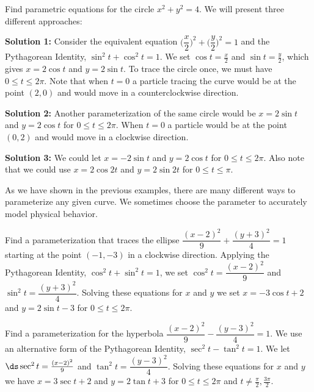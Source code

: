 \begin{example}\label{ex_par_circle}
Find parametric equations for the circle $x^2+y^2=4$.
\solution
We will present three different approaches:

\textbf{Solution 1:} Consider the equivalent equation $\biggl(\dfrac{x}{2}\biggr)^2+ \biggl(\dfrac{y}{2}\biggr)^2=1$ and the Pythagorean Identity, $\sin^2t+\cos^2 t=1$. We set $\cos t=\frac{x}{2}$ and $\sin t=\frac{y}{2}$, which gives $x=2\cos t$ and $y=2\sin t$. To trace the circle once, we must have $0\leq t \leq 2\pi$. Note that when $t=0$ a particle tracing the curve would be at the point $(2,0)$ and would move in a counterclockwise direction.

\textbf{Solution 2:} Another parameterization of the same circle would be $x=2\sin t$ and $y=2\cos t$ for $0\leq t \leq 2\pi$. When $t=0$ a particle would be at the point $(0,2)$ and would move in a clockwise direction.

\textbf{Solution 3:} We could let $x=-2\sin t$ and $y=2\cos t$ for $0\leq t \leq 2\pi$. Also note that we could use $x=2\cos 2t$ and $y=2\sin 2t$ for $0\leq t \leq \pi$.
\end{example}

As we have shown in the previous examples, there are many different ways to parameterize any given curve. We sometimes choose the parameter to accurately model physical behavior.

\begin{example}\label{ex_para_ellipse}
Find a parameterization that traces the ellipse $\dfrac{(x-2)^2}{9}+\dfrac{(y+3)^2}{4}=1$ starting at the point $(-1,-3)$ in a clockwise direction.
\solution
Applying the Pythagorean Identity, $\cos^2t+\sin^2t=1$, we set $\cos^2 t=\dfrac{(x-2)^2}{9}$ and $\sin^2 t=\dfrac{(y+3)^2}{4}$. Solving these equations for $x$ and $y$ we set $x=-3\cos t+2$ and $y=2\sin t-3$  for $0\leq t\leq 2\pi$.
\end{example}

\begin{example}\label{ex_para_hyper}
Find a parameterization for the hyperbola $\dfrac{(x-2)^2}{9}-\dfrac{(y-3)^2}{4}=1$.
\solution
We use an alternative form of the Pythagorean Identity, $\sec^2t-\tan^2t=1$. We let  $\ds \sec^2 t=\frac{(x-2)^2}{9}$ and $\tan^2 t=\dfrac{(y-3)^2}{4}$. Solving these equations for $x$ and $y$ we have $x=3\sec t +2$ and $y=2\tan t +3$ for $0\leq t\leq 2\pi$ and $t\neq\frac\pi2,\frac{3\pi}2$.
\end{example}

